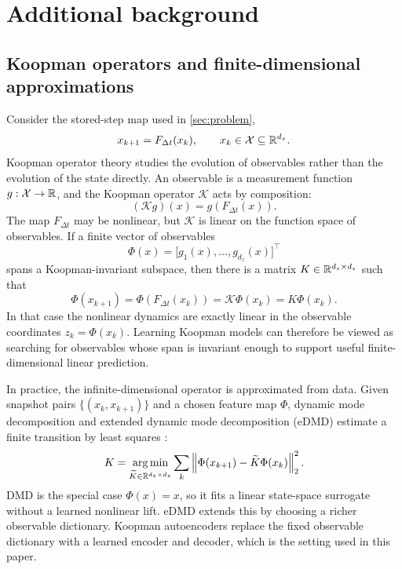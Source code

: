 \section{Additional background}
\label{app:background}

\subsection{Koopman operators and finite-dimensional approximations}
\label{app:koopman_background}

Consider the stored-step map used in \cref{sec:problem},
\begin{equation}
  x_{k+1}=F_{\Delta t}(x_k), \qquad x_k\in\mathcal X\subseteq\mathbb{R}^{d_x}.
\end{equation}
Koopman operator theory studies the evolution of observables rather than the evolution of the state directly. An observable is a measurement function \(g:\mathcal X\to\mathbb{R}\), and the Koopman operator \(\mathcal K\) acts by composition:
\begin{equation}
  (\mathcal K g)(x)=g(F_{\Delta t}(x)).
\end{equation}
The map \(F_{\Delta t}\) may be nonlinear, but \(\mathcal K\) is linear on the function space of observables. If a finite vector of observables
\begin{equation}
  \Phi(x)=\big[g_1(x),\ldots,g_{d_z}(x)\big]^\top
\end{equation}
spans a Koopman-invariant subspace, then there is a matrix \(K\in\mathbb{R}^{d_z\times d_z}\) such that
\begin{equation}
  \Phi(x_{k+1})=\Phi(F_{\Delta t}(x_k))=\mathcal K\Phi(x_k)=K\Phi(x_k).
\end{equation}
In that case the nonlinear dynamics are exactly linear in the observable coordinates \(z_k=\Phi(x_k)\). Learning Koopman models can therefore be viewed as searching for observables whose span is invariant enough to support useful finite-dimensional linear prediction.

In practice, the infinite-dimensional operator is approximated from data. Given snapshot pairs \(\{(x_k,x_{k+1})\}\) and a chosen feature map \(\Phi\), dynamic mode decomposition and extended dynamic mode decomposition (eDMD) estimate a finite transition by least squares \citep{schmid_dmd_2010,rowley_2009_spectral,tu_dynamic_2014,williams_datadriven_2015,williams_kernel-based_2016}:
\begin{equation}
  K
  =
  \operatorname*{arg\,min}_{\widetilde K\in\mathbb{R}^{d_z\times d_z}}
  \sum_k \left\lVert \Phi(x_{k+1})-\widetilde K\Phi(x_k) \right\rVert_2^2.
\end{equation}
DMD is the special case \(\Phi(x)=x\), so it fits a linear state-space surrogate without a learned nonlinear lift. eDMD extends this by choosing a richer observable dictionary. Koopman autoencoders replace the fixed observable dictionary with a learned encoder and decoder, which is the setting used in this paper.

